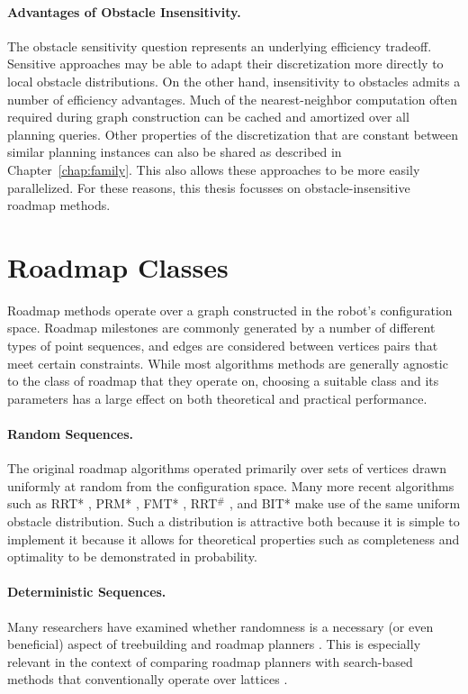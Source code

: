 \paragraph{Advantages of Obstacle Insensitivity.}
The obstacle sensitivity question represents an underlying efficiency
tradeoff.
Sensitive approaches may be able to adapt their discretization more
directly to local obstacle distributions.
On the other hand,
insensitivity to obstacles admits a number of efficiency advantages.
Much of the nearest-neighbor computation
often required during graph construction can be cached and amortized
over all planning queries.
Other properties of the discretization that are constant between
similar planning instances can also be shared
as described in Chapter~\ref{chap:family}.
This also allows these approaches to be more easily parallelized.
For these reasons,
this thesis focusses on obstacle-insensitive roadmap methods.

\section{Roadmap Classes}
\label{sec:roadmaps:roadmap-classes}

Roadmap methods operate over a graph constructed in the
robot's configuration space.
Roadmap milestones are commonly generated by a number of different
types of point sequences,
and edges are considered between vertices pairs that meet
certain constraints.
While most algorithms methods are generally agnostic
to the class of roadmap that they operate on,
choosing a suitable class and its parameters has a large effect
on both theoretical and practical performance.

\paragraph{Random Sequences.}
The original roadmap algorithms
\citep{kavrakietal1996prm}
operated primarily over sets
of vertices drawn uniformly at random from the configuration space.
Many more recent algorithms such as
RRT* \citep{karaman2010rrtstar},
PRM* \citep{karaman2011samplingoptimal},
FMT* \citep{janson2015fmtstar},
RRT$^{\#}$ \citep{arslan2013rrtsharp},
and BIT* \citep{gammell2015bitstar} make use of the same
uniform obstacle distribution.
Such a distribution is attractive both because
it is simple to implement
it because it allows for theoretical properties such as
completeness and optimality to be demonstrated
in probability.

\paragraph{Deterministic Sequences.}
Many researchers have examined whether randomness is a necessary
(or even beneficial) aspect of treebuilding and roadmap planners
\citep{branicky2002detvsprobroadmaps}.
This is especially relevant in the context of comparing
roadmap planners with search-based methods
that conventionally operate over lattices \citep{lavalle2002gridprms}.

